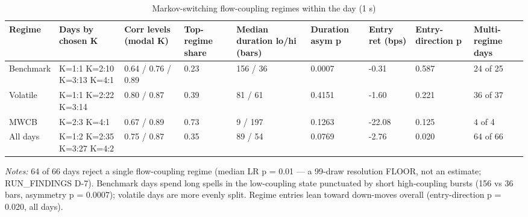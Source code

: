 \begin{table}[htbp]\centering
\caption{Markov-switching flow-coupling regimes within the day (1 s)}
\label{tab:t12}
\small
\begin{tabular}{lllllllll}
\toprule
Regime & Days by chosen K & Corr levels (modal K) & Top-regime share & Median duration lo/hi (bars) & Duration asym p & Entry ret (bps) & Entry-direction p & Multi-regime days \\
\midrule
Benchmark & K=1:1 K=2:10 K=3:13 K=4:1 & 0.64 / 0.76 / 0.89 & 0.23 & 156 / 36 & 0.0007 & -0.31 & 0.587 & 24 of 25 \\
Volatile & K=1:1 K=2:22 K=3:14 & 0.80 / 0.87 & 0.39 & 81 / 61 & 0.4151 & -1.60 & 0.221 & 36 of 37 \\
MWCB & K=2:3 K=4:1 & 0.67 / 0.89 & 0.73 & 9 / 197 & 0.1263 & -22.08 & 0.125 & 4 of 4 \\
All days & K=1:2 K=2:35 K=3:27 K=4:2 & 0.75 / 0.87 & 0.35 & 89 / 54 & 0.0769 & -2.76 & 0.020 & 64 of 66 \\
\bottomrule
\end{tabular}
\begin{minipage}{\linewidth}\vspace{2pt}\footnotesize\emph{Notes:} 64 of 66 days reject a single flow-coupling regime (median LR p = 0.01 — a 99-draw resolution FLOOR, not an estimate; RUN\_FINDINGS D-7). Benchmark days spend long spells in the low-coupling state punctuated by short high-coupling bursts (156 vs 36 bars, asymmetry p = 0.0007); volatile days are more evenly split. Regime entries lean toward down-moves overall (entry-direction p = 0.020, all days).\end{minipage}
\end{table}
